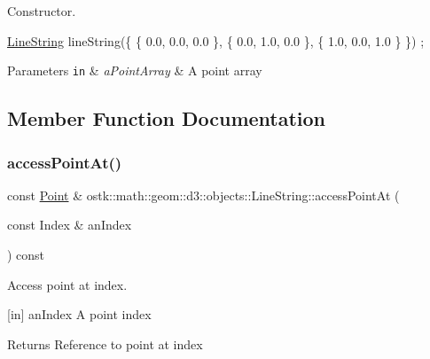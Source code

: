 Constructor. 


\begin{DoxyCode}
\hyperlink{classostk_1_1math_1_1geom_1_1d3_1_1objects_1_1_line_string_a711ebaa7353366ba729bf1ed648fd5a4}{LineString} lineString(\{ \{ 0.0, 0.0, 0.0 \}, \{ 0.0, 1.0, 0.0 \}, \{ 1.0, 0.0, 1.0 \} \}) ;
\end{DoxyCode}



\begin{DoxyParams}[1]{Parameters}
\mbox{\tt in}  & {\em a\+Point\+Array} & A point array \\
\hline
\end{DoxyParams}


\subsection{Member Function Documentation}
\mbox{\label{classostk_1_1math_1_1geom_1_1d3_1_1objects_1_1_line_string_acdad3606a8b71356a759420d6d56f258}} 
\subsubsection{\texorpdfstring{access\+Point\+At()}{accessPointAt()}}
{\footnotesize\ttfamily const \hyperlink{classostk_1_1math_1_1geom_1_1d3_1_1objects_1_1_point}{Point} \& ostk\+::math\+::geom\+::d3\+::objects\+::\+Line\+String\+::access\+Point\+At (\begin{DoxyParamCaption}\item[{const Index \&}]{an\+Index }\end{DoxyParamCaption}) const}



Access point at index. 

\mbox{[}in\mbox{]} an\+Index A point index \begin{DoxyReturn}{Returns}
Reference to point at index 
\end{DoxyReturn}
\mbox{\label{classostk_1_1math_1_1geom_1_1d3_1_1objects_1_1_line_string_a8d1b47e4f9e314a5fc7df353c808dbc2}} 
